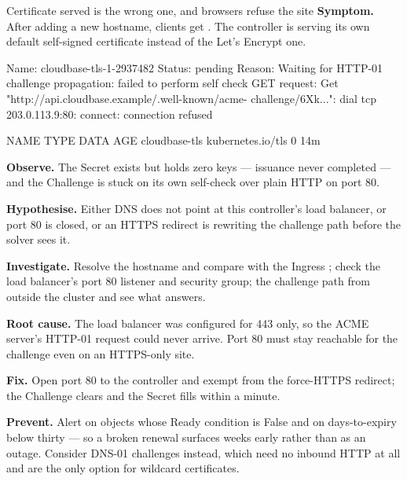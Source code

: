 \begin{debuglab}{Certificate served is the wrong one, and browsers refuse the site}
\textbf{Symptom.} After adding a new hostname, clients get . The controller is serving its own default self-signed certificate instead of the Let's Encrypt one.

\begin{outbox}
Name:    cloudbase-tls-1-2937482
Status:  pending
Reason:  Waiting for HTTP-01 challenge propagation: failed to perform self check
         GET request: Get "http://api.cloudbase.example/.well-known/acme-
         challenge/6Xk...": dial tcp 203.0.113.9:80: connect: connection refused

NAME             TYPE                DATA   AGE
cloudbase-tls    kubernetes.io/tls   0      14m
\end{outbox}

\begin{tickcheck}
  \item \textbf{Observe.} The Secret exists but holds zero keys --- issuance never completed --- and the Challenge is stuck on its own self-check over plain HTTP on port 80.
  \item \textbf{Hypothesise.} Either DNS does not point at this controller's load balancer, or port 80 is closed, or an HTTPS redirect is rewriting the challenge path before the solver sees it.
  \item \textbf{Investigate.} Resolve the hostname and compare with the Ingress ; check the load balancer's port 80 listener and security group;  the challenge path from outside the cluster and see what answers.
  \item \textbf{Root cause.} The load balancer was configured for 443 only, so the ACME server's HTTP-01 request could never arrive. Port 80 must stay reachable for the challenge even on an HTTPS-only site.
  \item \textbf{Fix.} Open port 80 to the controller and exempt  from the force-HTTPS redirect; the Challenge clears and the Secret fills within a minute.
  \item \textbf{Prevent.} Alert on  objects whose Ready condition is False and on days-to-expiry below thirty --- so a broken renewal surfaces weeks early rather than as an outage. Consider DNS-01 challenges instead, which need no inbound HTTP at all and are the only option for wildcard certificates.
\end{tickcheck}
\end{debuglab}

